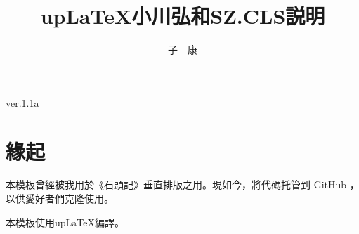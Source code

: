 \documentclass[uplatex,a4paper,10pt]{ujarticle}
\begin{document}


\mcfamily

\title{\mcfamily\bfseries{up\LaTeX}{小川弘和}{SZ.CLS}{説明}}
\author{子　康}
\maketitle
\begin{center}
{\fontsize{10pt}{12}\selectfont\ttfamily
ver.1.1a
}
\end{center}
\vskip20mm

\section{緣起}
\par 本模板曾經被我用於《石頭記》垂直排版之用。現如今，將代碼托管到 GitHub ，
以供愛好者們克隆使用。
\par 本模板使用{up\LaTeX}編譯。










\end{document}

